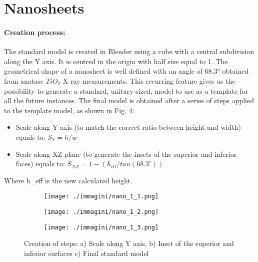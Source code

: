 \section{Nanosheets}

\paragraph{Creation process: }

The standard model is created in Blender using a cube with a central subdivision along the Y axis. It is centred in the origin with half size equal to 1. The geometrical shape of a nanosheet is well defined \cite{angleTIO2} with an angle of 68.3° obtained from anatase $TiO_2$ X-ray measurements. This recurring feature gives us the possibility to generate a standard, unitary-sized, model to use as a template for all the future instances.
The final model is obtained after a series of steps applied to the template model, as shown in Fig. \ref{fig:nano_creation}:
%
\begin{itemize}
    \item Scale along Y axis (to match the correct ratio between height and width) equals to: $S_Y = h / w$
    \item Scale along XZ plane (to generate the insets of the superior and inferior faces) equals to: $S_{XZ} = 1 - (h_{\text{eff}} / tan(68.3^{\circ}))$
\end{itemize}
%
Where h\_eff is the new calculated height.

\begin{figure}[ht]
    \centering
    \begin{subfigure}[b]{0.32\textwidth}
        \texttt{[image: ./immagini/nano\_1\_1.png]}
        \caption{}
        \label{fig:nano_creation_a}
    \end{subfigure}
    \hfill
    \begin{subfigure}[b]{0.32\textwidth}
        \texttt{[image: ./immagini/nano\_1\_2.png]}
        \caption{}
        \label{fig:nano_creation_b}
    \end{subfigure}
    \hfill
    \begin{subfigure}[b]{0.32\textwidth}
        \texttt{[image: ./immagini/nano\_1\_3.png]}
        \caption{}
        \label{fig:nano_creation_c}
    \end{subfigure}
    \caption{Creation of steps: a) Scale along Y axis, b) Inset of the superior and inferior surfaces c) Final standard model}
    \label{fig:nano_creation}
\end{figure}

